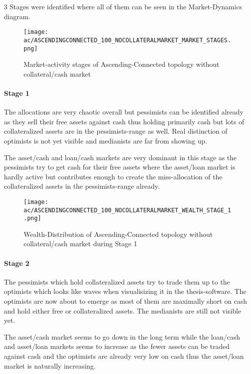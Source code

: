 \documentclass[Bachelorarbeit.tex]{subfiles}
\begin{document}
3 Stages were identified where all of them can be seen in the Market-Dynamics diagram.

\begin{figure}[H]
	\centering
  \texttt{[image: ac/ASCENDINGCONNECTED\_100\_NOCOLLATERALMARKET\_MARKET\_STAGES.png]}
  	\caption{Market-activity stages of Ascending-Connected topology without collateral/cash market}
	\label{fig:markets_ASCENDINGCONNECTED_100_NOCOLLATERALMARKET_MARKET_STAGES}
\end{figure}

\paragraph{Stage 1}
The allocations are very chaotic overall but pessimists can be identified already as they sell their free assets against cash thus holding primarily cash but lots of collateralized assets are in the pessimists-range as well. Real distinction of optimists is not yet visible and medianists are far from showing up.

\medskip

The asset/cash and loan/cash markets are very dominant in this stage as the pessimists try to get cash for their free assets where the asset/loan market is hardly active but contributes enough to create the miss-allocation of the collateralized assets in the pessimists-range already.

\begin{figure}[H]
	\centering
  \texttt{[image: ac/ASCENDINGCONNECTED\_100\_NOCOLLATERALMARKET\_WEALTH\_STAGE\_1.png]}
  	\caption{Wealth-Distribution of Ascending-Connected topology without collateral/cash market during Stage 1}
	\label{fig:markets_ASCENDINGCONNECTED_100_NOCOLLATERALMARKET_WEALTH_STAGE_1}
\end{figure}

\paragraph{Stage 2}
The pessimists which hold collateralized assets try to trade them up to the optimists which looks like waves when visualisizing it in the thesis-software. The optimists are now about to emerge as most of them are maximally short on cash and hold either free or collateralized assets. The medianists are still not visible yet.

\medskip
		
The asset/cash market seems to go down in the long term while the loan/cash and asset/loan markets seems to increase as the fewer assets can be traded against cash and the optimists are already very low on cash thus the asset/loan market is naturally increasing.
		
\end{document}
